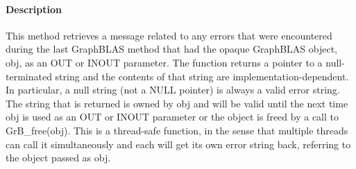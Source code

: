 \paragraph{Description}

This method retrieves a message related to any errors that were encountered 
during the last GraphBLAS method that had the opaque GraphBLAS object, 
{\sf obj}, as an {\sf OUT} or {\sf INOUT} parameter.   The function returns a 
pointer to a null-terminated string and the contents of that string are 
implementation-dependent.  In particular, a null 
string (not a {\sf NULL} pointer) is always a valid error string.  The string 
that is returned is owned by {\sf obj} and will be valid until the next time 
{\sf obj} is used as an {\sf OUT} or {\sf INOUT} parameter or the object is freed
by a call to {\sf GrB\_free(obj)}.
{\color{red}
This is a thread-safe function, in the sense that multiple threads can call it
simultaneously and each will get its own error string back, referring to the
object passed as {\sf obj}.} 